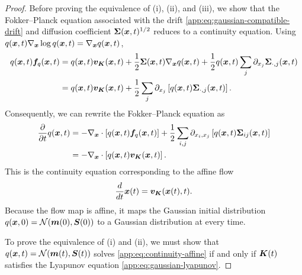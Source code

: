 \begin{proof}
Before proving the equivalence of (i), (ii), and (iii), we show that the Fokker--Planck equation associated with
the drift \eqref{app:eq:gaussian-compatible-drift} and diffusion coefficient $\boldsymbol{\Sigma}(\boldsymbol{x}, t)^{1/2}$ reduces to a continuity equation. 
Using $q(\boldsymbol{x}, t)\nabla_{\boldsymbol{x}}\log q(\boldsymbol{x}, t)=\nabla_{\boldsymbol{x}} q(\boldsymbol{x}, t)$,
\begin{equation*}
\begin{aligned}
    q(\boldsymbol{x},t)\boldsymbol{f}_{q}(\boldsymbol{x},t) &= q(\boldsymbol{x},t)\boldsymbol{v}_{\boldsymbol{K}}(\boldsymbol{x},t) + \frac{1}{2}\boldsymbol{\Sigma}(\boldsymbol{x},t)\nabla_{\boldsymbol{x}}q(\boldsymbol{x},t) + \frac{1}{2}q(\boldsymbol{x},t) \sum_j\partial_{x_j}\boldsymbol{\Sigma}_{\cdot,j}(\boldsymbol{x},t)\\
    &= q(\boldsymbol{x},t)\boldsymbol{v}_{\boldsymbol{K}}(\boldsymbol{x},t) + \frac{1}{2}\sum_j \partial_{x_j}\left[ q(\boldsymbol{x},t)\boldsymbol{\Sigma}_{\cdot,j}(\boldsymbol{x},t)\right].
\end{aligned}
\end{equation*}
Consequently, we can rewrite the Fokker--Planck equation as
\begin{align}
    \frac{\partial}{\partial t}q(\boldsymbol{x},t) &= -\nabla_{\boldsymbol{x}}\cdot \left[ q(\boldsymbol{x},t)\boldsymbol{f}_{q}(\boldsymbol{x},t) \right] + \frac{1}{2} \sum_{i,j} \partial_{x_i,x_j} \left[q(\boldsymbol{x},t)\boldsymbol{\Sigma}_{ij}(\boldsymbol{x},t)\right]\nonumber\\
    &= -\nabla_{\boldsymbol{x}}\cdot\left[q(\boldsymbol{x},t)\boldsymbol{v}_{\boldsymbol{K}}(\boldsymbol{x},t) \right].\label{app:eq:continuity-affine}
\end{align}
This is the continuity equation corresponding to the affine flow
\begin{equation}\label{app:eq:affine-flow}
    \frac{d}{d t}\boldsymbol{x}(t)
    =
    \boldsymbol{v}_{\boldsymbol{K}}(\boldsymbol{x}(t),t).
\end{equation}
Because the flow map is affine, it maps the Gaussian initial distribution $q(\boldsymbol{x},0)=\mathcal{N}(\boldsymbol{m}(0),\boldsymbol{S}(0))$ to a Gaussian distribution at every time.

To prove the equivalence of (i) and (ii), we must show that  $q(\boldsymbol{x},t)=\mathcal{N}(\boldsymbol{m}(t),\boldsymbol{S}(t))$ solves \cref{app:eq:continuity-affine} if and only if $\boldsymbol{K}(t)$ satisfies the Lyapunov equation \cref{app:eq:gaussian-lyapunov}.


\end{proof}
